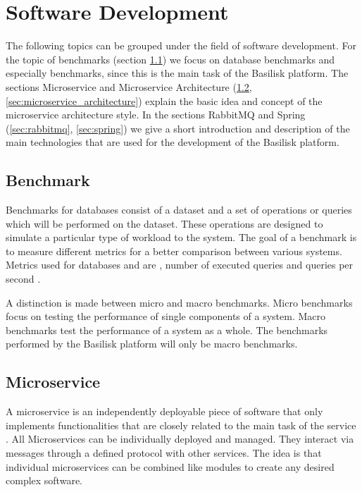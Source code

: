 \section{Software Development}
\label{sec:software_dev}
The following topics can be grouped under the field of software development.
For the topic of benchmarks (section \ref{sec:benchmark}) we focus on database benchmarks and especially \ts{} benchmarks, since this is the main task of the Basilisk platform.
The sections Microservice and Microservice Architecture (\ref{sec:microservice}, \ref{sec:microservice_architecture}) explain the basic idea and concept of the microservice architecture style.
In the sections RabbitMQ and Spring (\ref{sec:rabbitmq}, \ref{sec:spring}) we give a short introduction and description of the main technologies that are used for the development of the Basilisk platform.

\subsection{Benchmark}
\label{sec:benchmark}
Benchmarks for databases consist of a dataset and a set of operations or queries which will be performed on the dataset.
These operations are designed to simulate a particular type of workload to the system.
The goal of a benchmark is to measure different metrics for a better comparison between various systems.
Metrics used for databases and \tsp{} are \eg, number of executed queries and queries per second \cite{IguanaDocumentationMetrics}.

A distinction is made between micro and macro benchmarks.
Micro benchmarks focus on testing the performance of single components of a system.
Macro benchmarks test the performance of a system as a whole.
The benchmarks performed by the Basilisk platform will only be macro benchmarks.

\subsection{Microservice}
\label{sec:microservice}
A microservice is an independently deployable piece of software that only implements functionalities that are closely related to the main task of the service \cite{dragoniMicroservicesYesterdayToday2017}.
All Microservices can be individually deployed and managed.
They interact via messages through a defined protocol with other services.
The idea is that individual microservices can be combined like modules to create any desired complex software.


